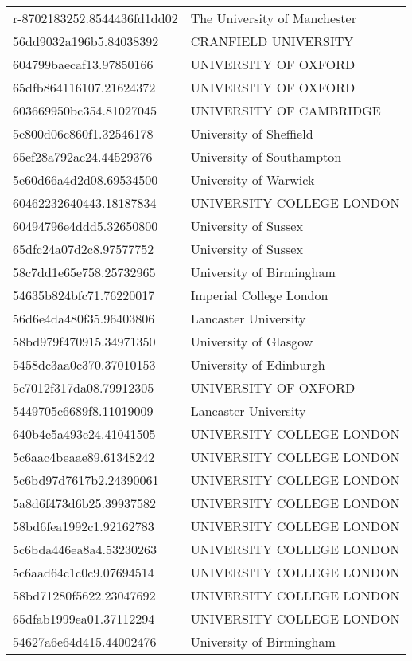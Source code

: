 \begin{tabular}{ll}
r-8702183252.8544436fd1dd02 & The University of Manchester \\
56dd9032a196b5.84038392 & CRANFIELD UNIVERSITY \\
604799baecaf13.97850166 & UNIVERSITY OF OXFORD \\
65dfb864116107.21624372 & UNIVERSITY OF OXFORD \\
603669950bc354.81027045 & UNIVERSITY OF CAMBRIDGE \\
5c800d06c860f1.32546178 & University of Sheffield \\
65ef28a792ac24.44529376 & University of Southampton \\
5e60d66a4d2d08.69534500 & University of Warwick \\
60462232640443.18187834 & UNIVERSITY COLLEGE LONDON \\
60494796e4ddd5.32650800 & University of Sussex \\
65dfc24a07d2c8.97577752 & University of Sussex \\
58c7dd1e65e758.25732965 & University of Birmingham \\
54635b824bfc71.76220017 & Imperial College London \\
56d6e4da480f35.96403806 & Lancaster University \\
58bd979f470915.34971350 & University of Glasgow \\
5458dc3aa0c370.37010153 & University of Edinburgh \\
5c7012f317da08.79912305 & UNIVERSITY OF OXFORD \\
5449705c6689f8.11019009 & Lancaster University \\
640b4e5a493e24.41041505 & UNIVERSITY COLLEGE LONDON \\
5c6aac4beaae89.61348242 & UNIVERSITY COLLEGE LONDON \\
5c6bd97d7617b2.24390061 & UNIVERSITY COLLEGE LONDON \\
5a8d6f473d6b25.39937582 & UNIVERSITY COLLEGE LONDON \\
58bd6fea1992c1.92162783 & UNIVERSITY COLLEGE LONDON \\
5c6bda446ea8a4.53230263 & UNIVERSITY COLLEGE LONDON \\
5c6aad64c1c0c9.07694514 & UNIVERSITY COLLEGE LONDON \\
58bd71280f5622.23047692 & UNIVERSITY COLLEGE LONDON \\
65dfab1999ea01.37112294 & UNIVERSITY COLLEGE LONDON \\
54627a6e64d415.44002476 & University of Birmingham \\

\end{tabular}
